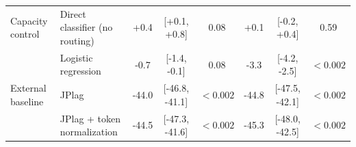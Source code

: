 \begin{table}[t]
\begin{tabular}{ll|ccc|ccc}
\midrule
Capacity control & Direct classifier (no routing) & +0.4 & [+0.1, +0.8] & 0.08 & +0.1 & [-0.2, +0.4] & 0.59 \\
 & Logistic regression & -0.7 & [-1.4, -0.1] & 0.08 & -3.3 & [-4.2, -2.5] & $<0.002$ \\
\midrule
External baseline & JPlag & -44.0 & [-46.8, -41.1] & $<0.002$ & -44.8 & [-47.5, -42.1] & $<0.002$ \\
 & JPlag + token normalization & -44.5 & [-47.3, -41.6] & $<0.002$ & -45.3 & [-48.0, -42.5] & $<0.002$ \\
\bottomrule
\end{tabular}
\end{table}